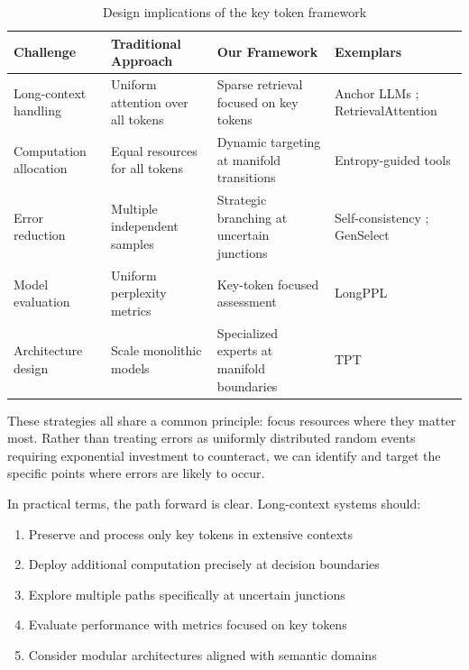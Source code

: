 \documentclass{article}
\begin{document}
\begin{table}[ht]
\caption{Design implications of the key token framework}
\centering
\small
\begin{tabular}{p{2.6cm}p{3cm}p{3cm}p{3.5cm}}
\toprule
\textbf{Challenge} & \textbf{Traditional Approach} & \textbf{Our Framework} & \textbf{Exemplars} \\
\midrule
Long-context handling & Uniform attention over all tokens & Sparse retrieval focused on key tokens & Anchor LLMs \citep{pang2024anchor}; RetrievalAttention \citep{liu2024retrieval} \\
\midrule
Computation allocation & Equal resources for all tokens & Dynamic targeting at manifold transitions & Entropy-guided tools \citep{moshkov2025aimo} \\
\midrule
Error reduction & Multiple independent samples & Strategic branching at uncertain junctions & Self-consistency \citep{wang2023self}; GenSelect \citep{moshkov2025aimo} \\
\midrule
Model evaluation & Uniform perplexity metrics & Key-token focused assessment & LongPPL \citep{fang2024what} \\
\midrule
Architecture design & Scale monolithic models & Specialized experts at manifold boundaries & TPT \citep{costello2025think} \\
\bottomrule
\end{tabular}
\label{tab:implications}
\end{table}

These strategies all share a common principle: focus resources where they matter most. Rather than treating errors as uniformly distributed random events requiring exponential investment to counteract, we can identify and target the specific points where errors are likely to occur.

In practical terms, the path forward is clear. Long-context systems should:

\begin{enumerate}
\item Preserve and process only key tokens in extensive contexts
\item Deploy additional computation precisely at decision boundaries
\item Explore multiple paths specifically at uncertain junctions
\item Evaluate performance with metrics focused on key tokens
\item Consider modular architectures aligned with semantic domains
\end{enumerate}
\end{document}
